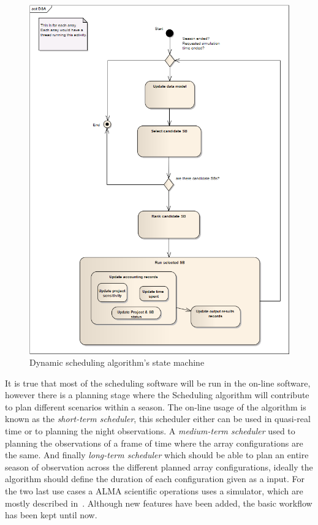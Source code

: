 \begin{figure}	
\begin{center}
\includegraphics[width=\textwidth]{images/alma-dsa-state-machine}
\caption{Dynamic scheduling algorithm's state machine}
\end{center}
\label{fig:sched-dsa-state-machine}
\end{figure}


It is true that most of the scheduling software will be run in the on-line software, however there is a planning stage where the Scheduling algorithm will contribute to plan different scenarios within a season. The on-line usage of the algorithm is known as the \textit{short-term scheduler}, this scheduler either can be used in quasi-real time or to planning the night observations. A \textit{medium-term scheduler} used to planning the observations of a frame of time where the array configurations are the same. And finally \textit{long-term scheduler} which should be able to plan an entire season of observation across the different planned array configurations, ideally the algorithm should define the duration of each configuration given as a input. For the two last use cases a ALMA scientific operations uses a simulator, which are mostly described in~\cite{hoffstadt10}. Although new features have been added, the basic workflow has been kept until now.